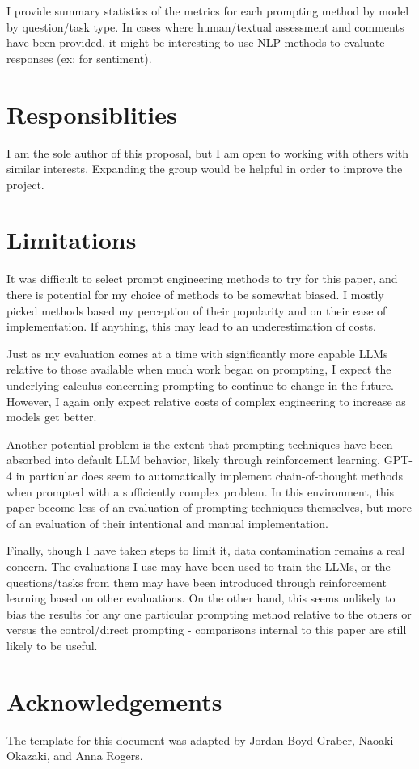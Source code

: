 \documentclass[11pt]{article}
\begin{document}
I provide summary statistics of the metrics for each prompting method by model by question/task type. In cases where human/textual assessment and comments have been provided, it might be interesting to use NLP methods to evaluate responses (ex: for sentiment).

\section*{Responsiblities}

I am the sole author of this proposal, but I am open to working with others with similar interests. Expanding the group would be helpful in order to improve the project.

\section*{Limitations}

It was difficult to select prompt engineering methods to try for this paper, and there is potential for my choice of methods to be somewhat biased. I mostly picked methods based my perception of their popularity and on their ease of implementation. If anything, this may lead to an underestimation of costs.

Just as my evaluation comes at a time with significantly more capable LLMs relative to those available when much work began on prompting, I expect the underlying calculus concerning prompting to continue to change in the future. However, I again only expect relative costs of complex engineering to increase as models get better.

Another potential problem is the extent that prompting techniques have been absorbed into default LLM behavior, likely through reinforcement learning. GPT-4 in particular does seem to automatically implement chain-of-thought methods when prompted with a sufficiently complex problem. In this environment, this paper become less of an evaluation of prompting techniques themselves, but more of an evaluation of their intentional and manual implementation.

Finally, though I have taken steps to limit it, data contamination remains a real concern. The evaluations I use may have been used to train the LLMs, or the questions/tasks from them may have been introduced through reinforcement learning based on other evaluations. On the other hand, this seems unlikely to bias the results for any one particular prompting method relative to the others or versus the control/direct prompting - comparisons internal to this paper are still likely to be useful.

\section*{Acknowledgements}
The template for this document was adapted by Jordan Boyd-Graber, Naoaki Okazaki, and Anna Rogers.



\end{document}
